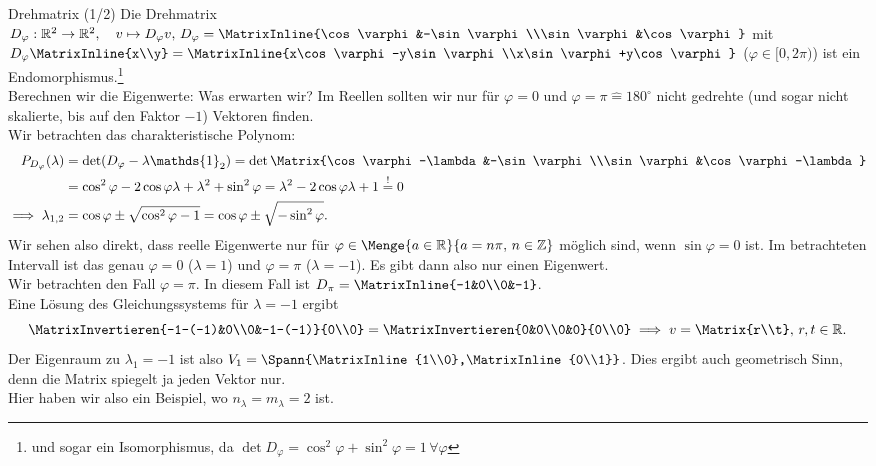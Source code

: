\begin{Beispiel}{Drehmatrix (1/2)}
Die Drehmatrix $D_\varphi:\mathbb{R}^2\to\mathbb{R}^2,\quad v\mapsto D_\varphi v,\, D_\varphi=\MatrixInline{\cos\varphi&-\sin\varphi\\\sin\varphi&\cos\varphi}$ mit\\ $D_\varphi\MatrixInline{x\\y}=\MatrixInline{x\cos\varphi-y\sin\varphi\\x\sin\varphi+y\cos\varphi}$ ($\varphi\in[0,2\pi)$) ist ein Endomorphismus.\footnote{und sogar ein Isomorphismus, da $\det D_\varphi=\cos^2\varphi+\sin^2\varphi=1\,\forall\varphi$}\\
Berechnen wir die Eigenwerte: Was erwarten wir? Im Reellen sollten wir nur für $\varphi=0$ und $\varphi=\pi\hat{=}180^\circ$ nicht gedrehte (und sogar nicht skalierte, bis auf den Faktor $-1$) Vektoren finden.\\
Wir betrachten das charakteristische Polynom:
\begin{align*}
P_{D_\varphi}(\lambda)&=\det(D_\varphi-\lambda\mathds{1}_2)=\det\Matrix{\cos\varphi-\lambda&-\sin\varphi\\\sin\varphi&\cos\varphi-\lambda}\\
&=\cos^2\varphi-2\cos\varphi\lambda+\lambda^2+\sin^2\varphi=\lambda^2-2\cos\varphi\lambda+1\overset{!}{=}0\\
\implies \lambda_{1,2}&=\cos\varphi\pm\sqrt{\cos^2\varphi-1}=\cos\varphi\pm\sqrt{-\sin^2\varphi}.
\end{align*}
Wir sehen also direkt, dass reelle Eigenwerte nur für $\varphi\in\Menge{a\in\mathbb{R}}{a=n\pi,\,n\in\mathbb{Z}}$ möglich sind, wenn $\sin\varphi=0$ ist. Im betrachteten Intervall ist das genau $\varphi=0$ ($\lambda=1$) und $\varphi=\pi$ ($\lambda=-1$). Es gibt dann also nur einen Eigenwert.\\
Wir betrachten den Fall $\varphi=\pi$. In diesem Fall ist $D_\pi=\MatrixInline{-1&0\\0&-1}$.\\
Eine Lösung des Gleichungssystems für $\lambda=-1$ ergibt
\begin{equation*}
    \MatrixInvertieren{-1-(-1)&0\\0&-1-(-1)}{0\\0}=\MatrixInvertieren{0&0\\0&0}{0\\0}\implies v=\Matrix{r\\t},\,r,t\in\mathbb{R}.
\end{equation*}
Der Eigenraum zu $\lambda_1=-1$ ist also $V_1=\Spann{\MatrixInline{1\\0},\MatrixInline{0\\1}}$. Dies ergibt auch geometrisch Sinn, denn die Matrix spiegelt ja jeden Vektor nur.\\
Hier haben wir also ein Beispiel, wo $n_\lambda=m_\lambda=2$ ist.
\end{Beispiel}

